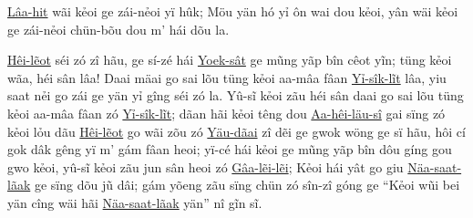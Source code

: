 \documentclass[twoside,twocolumn,a4paper,10pt]{memoir}
\begin{document}
\begin{scripture}
\begin{poetry}
  		\underline{Lâa-hit} wãi kẻoi ge zái-nẻoi yï hûk;
  		Möu yän hó yỉ ôn wai dou kẻoi, yân wäi kẻoi ge zái-nẻoi chün-bõu dou m' hái dõu la.
  	\end{poetry}
  	
  	\underline{Hêi-lẽot} séi zó zî hãu,  ge sí-zé hái \underline{Yoek-sât} ge mũng yãp bîn cêot yĩn; 
  	tüng kẻoi wãa, héi sân lâa! Daai mäai go sai lõu tüng kẻoi aa-mâa fâan \underline{Yỉ-sîk-lĩt} lâa, yiu saat nẻi go zái ge yän yỉ gîng séi zó la.
  	Yû-sĩ kẻoi zãu héi sân daai go sai lõu tüng kẻoi aa-mâa fâan zó \underline{Yỉ-sîk-lĩt};
  	dãan hãi kẻoi têng dou \underline{Aa-hêi-läu-sî} gai sïng zó kẻoi lỏu dãu \underline{Hêi-lẽot} go wãi zõu zó \underline{Yäu-dãai} zî dẽi ge gwok wöng ge sï hãu, hôi cí gok dâk gêng yï m' gám fâan heoi; yï-cé  hái kẻoi ge mũng yãp bîn dôu gíng gou gwo kẻoi, yû-sĩ kẻoi zãu jun sân heoi zó \underline{Gâa-lẽi-lẽi};
  	Kẻoi hái yât go giu \underline{Näa-saat-lãak} ge sïng dõu jũ dâi; gám yõeng zãu sïng chün zó sîn-zî góng ge ``Kẻoi wũi bei yän cîng wäi hãi \underline{Näa-saat-lãak} yän'' nî gĩn sĩ.
  	
  	
  	

\end{scripture}
\end{document}
